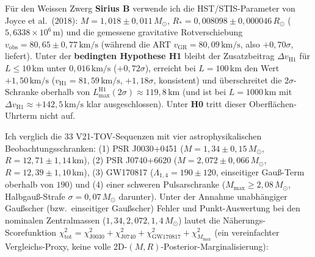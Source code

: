 \documentclass[10pt,a4paper]{article}
\begin{document}
\par
F\"ur den Weissen Zwerg \textbf{Sirius B} verwende ich die HST/STIS-Parameter von Joyce et al.\ (2018): $M = 1{,}018 \pm 0{,}011\,M_\odot$, $R_* = 0{,}008098 \pm 0{,}000046\,R_\odot$ ($5{,}6338\times 10^6\,\text{m}$) und die gemessene gravitative Rotverschiebung $v_{\text{obs}} = 80{,}65 \pm 0{,}77\,\text{km/s}$ (w\"ahrend die ART $v_{\text{GR}} = 80{,}09\,\text{km/s}$, also $+0{,}70\sigma$, liefert). Unter der \textbf{bedingten Hypothese H1} bleibt der Zusatzbeitrag $\Delta v_{\text{H1}}$ f\"ur $L \le 10\,\text{km}$ unter $0{,}016\,\text{km/s}$ ($+0{,}72\sigma$), erreicht bei $L = 100\,\text{km}$ den Wert $+1{,}50\,\text{km/s}$ ($v_{\text{H1}} = 81{,}59\,\text{km/s}$, $+1{,}18\sigma$, konsistent) und \"uberschreitet die $2\sigma$-Schranke oberhalb von \textbf{$L_{\max}^{\text{H1}}(2\sigma) \approx 119{,}8\,\text{km}$} (und ist bei $L = 1000\,\text{km}$ mit $\Delta v_{\text{H1}} \approx +142{,}5\,\text{km/s}$ klar ausgeschlossen). Unter \textbf{H0} tritt dieser Oberfl\"achen-Uhrterm nicht auf.

\par
Ich verglich die 33 V21-TOV-Sequenzen mit vier astrophysikalischen Beobachtungsschranken: (1) PSR J0030+0451 ($M = 1{,}34 \pm 0{,}15\,M_\odot$, $R = 12{,}71 \pm 1{,}14\,\text{km}$), (2) PSR J0740+6620 ($M = 2{,}072 \pm 0{,}066\,M_\odot$, $R = 12{,}39 \pm 1{,}10\,\text{km}$), (3) GW170817 ($\Lambda_{1{,}4} = 190 \pm 120$, einseitiger Gau\ss -Term oberhalb von $190$) und (4) einer schweren Pulsarschranke ($M_{\max} \ge 2{,}08\,M_\odot$, Halbgau\ss -Strafe $\sigma = 0{,}07\,M_\odot$ darunter). Unter der Annahme unabh\"angiger Gau\ss scher (bzw.\ einseitiger Gau\ss scher) Fehler und Punkt-Auswertung bei den nominalen Zentralmassen ($1{,}34, 2{,}072, 1{,}4\,M_\odot$) lautet die N\"aherungs-Scorefunktion $\chi^2_{\text{tot}} = \chi^2_{\text{J0030}} + \chi^2_{\text{J0740}} + \chi^2_{\text{GW170817}} + \chi^2_{M_{\max}}$ (ein vereinfachter Vergleichs-Proxy, keine volle 2D-$(M,R)$-Posterior-Marginalisierung):
\end{document}
